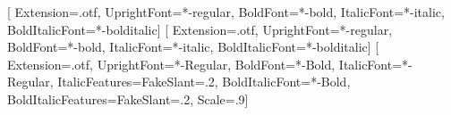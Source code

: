 \usepackage{fontspec}
\usepackage{xcolor}
\setmainfont{texgyreheros}[
  Extension=.otf,
  UprightFont=*-regular,
  BoldFont=*-bold,
  ItalicFont=*-italic,
  BoldItalicFont=*-bolditalic]
\setsansfont{texgyreheros}[
  Extension=.otf,
  UprightFont=*-regular,
  BoldFont=*-bold,
  ItalicFont=*-italic,
  BoldItalicFont=*-bolditalic]
\setmonofont{FiraMono}[
  Extension=.otf,
  UprightFont=*-Regular,
  BoldFont=*-Bold,
  ItalicFont=*-Regular,
  ItalicFeatures={FakeSlant=.2},
  BoldItalicFont=*-Bold,
  BoldItalicFeatures={FakeSlant=.2},
  Scale=.9]

